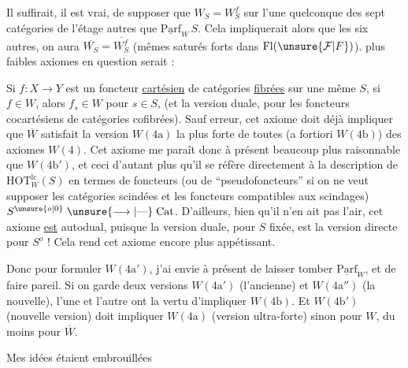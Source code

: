 Il suffirait, il est vrai, de supposer que $W_S=W_S^f$ sur
l'une quelconque des sept catégories de l'étage autres
que $\underline{\mathrm{Parf}}_W\,S$. Cela impliquerait alors que  les
six autres, on aura $\overline{W_S}=\overline{W_S^f}$ (mêmes saturés
forts dans $\mathrm{Fl}(\unsure{\mathcal{F}|F})$\unsure{,}).   plus faibles  axiomes
en question serait :

Si $f:X\longrightarrow Y$ est un foncteur \uline{cartésien} de catégories
 \uline{fibrées} sur une même $S$, si $f\in W$, alors $f_s\in W$
pour  $s\in S$,
(et  la version duale, pour les foncteurs cocartésiens de
catégories cofibrées).  Sauf erreur, cet axiome
doit déjà impliquer que $\overline W$ satisfait la version
$W(4\mathrm a)$ la plus forte de toutes (a fortiori $W(4\mathrm b)$)
des axiomes $W(4)$. Cet axiome me paraît donc à
présent beaucoup plus raisonnable que $W(4\mathrm b')$, et
ceci d'autant plus qu'il se réfère directement à la
description de $\mathrm{HOT}^{\mathrm{lc}}_W(S)$ en termes de foncteurs
(ou de ``pseudofoncteurs'' si on ne veut supposer les catégories
scindées et les foncteurs compatibles aux scindages)
$S^{\unsure{o|0}}\mathrel{\unsure{\longrightarrow|\text{---}}}\mathrm{Cat}$. D'ailleurs, bien qu'il n'en ait pas
l'air, cet axiome \uline{est} autodual, puisque la
version duale, pour $S$ fixée, est la version directe
pour $S^o$ ! Cela rend cet axiome encore plus
appétissant.

Donc pour formuler $W(4\mathrm a')$, j'ai envie
à présent de laisser tomber $\underline{\mathrm{Parf}}_W$, et de faire pareil.
Si on garde deux versions $W(4\mathrm a')$ (l'ancienne)
et $W(4\mathrm a'')$ (la nouvelle), l'une et l'autre ont
la vertu d'impliquer $W(4\mathrm b)$. Et $W(4\mathrm b')$ (nouvelle
version) doit impliquer $W(4\mathrm a)$ (version ultra-forte)
sinon pour $W$, du moins pour $\overline W$.

Mes idées étaient  embrouillées
